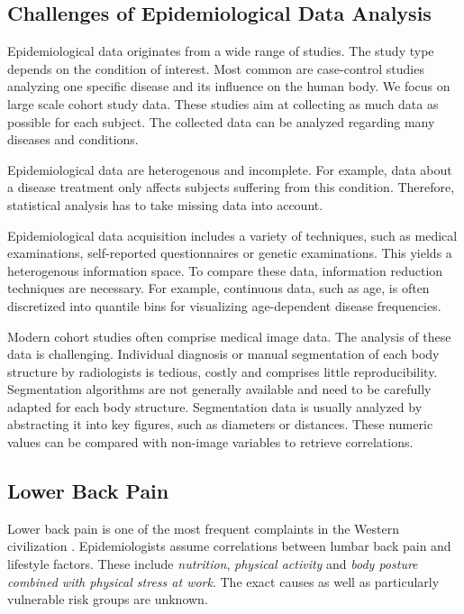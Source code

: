 \documentclass[a4paper,twoside]{style/article}
\begin{document}
\subsection{Challenges of Epidemiological Data Analysis}
Epidemiological data originates from a wide range of studies.
The study type depends on the condition of interest.
Most common are case-control studies analyzing one specific disease and its influence on the human body.
We focus on large scale cohort study data.
These studies aim at collecting as much data as possible for each subject.
The collected data can be analyzed regarding many diseases and conditions.

Epidemiological data are heterogenous and incomplete.
For example, data about a disease treatment only affects subjects suffering from this condition.
Therefore, statistical analysis has to take missing data into account.

Epidemiological data acquisition includes a variety of techniques, such as medical examinations, self-reported questionnaires or genetic examinations.
This yields a heterogenous information space.
To compare these data, information reduction techniques are necessary.
For example, continuous data, such as age, is often discretized into quantile bins for visualizing age-dependent disease frequencies.

Modern cohort studies often comprise medical image data.
The analysis of these data is challenging.
Individual diagnosis or manual segmentation of each body structure by radiologists is tedious, costly and comprises little reproducibility.
Segmentation algorithms are not generally available and need to be carefully adapted for each body structure.
Segmentation data is usually analyzed by abstracting it into key figures, such as diameters or distances.
These numeric values can be compared with non-image variables to retrieve correlations.
\subsection{Lower Back Pain}
Lower back pain is one of the most frequent complaints in the Western civilization \cite{Hoy2010}.
Epidemiologists assume correlations between lumbar back pain and lifestyle factors.
These include \emph{nutrition}, \emph{physical activity} and \emph{body posture combined with physical stress at work}.
The exact causes as well as particularly vulnerable risk groups are unknown.
\end{document}
